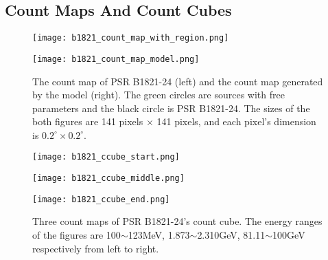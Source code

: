 \documentclass[12pt]{report}
\newcommand{\mycaption}[1]{\protect \caption{#1}}
\begin{document}
    \subsection{Count Maps And Count Cubes}
      \begin{figure}[!ht]
        \begin{center}
        \begin{minipage}{0.45\textwidth}
          \centering 
          \texttt{[image: b1821\_count\_map\_with\_region.png]}
        \end{minipage}
        \begin{minipage}{0.45\textwidth}
          \centering
          \texttt{[image: b1821\_count\_map\_model.png]}
        \end{minipage}
      \end{center}
      \mycaption{The count map of PSR B1821-24 (left) and the count map generated by 
        the model (right). The green circles are sources with free parameters and the black circle
        is PSR B1821-24. The sizes of the both figures are 141 pixels $\times$ 141 pixels, and 
        each pixel's dimension is $0.2^\circ \times 0.2^\circ$.}
      \label{fig: b1821_count_map_with_region_and_model}
      \end{figure}
  
      \begin{figure}[!ht]
        \begin{center}
          \begin{minipage}{0.31\textwidth}
            \begin{center} 
              \texttt{[image: b1821\_ccube\_start.png]}
            \end{center}
          \end{minipage}
          \begin{minipage}{0.31\textwidth}
            \begin{center}
              \texttt{[image: b1821\_ccube\_middle.png]}
            \end{center}
          \end{minipage}
          \begin{minipage}{0.31\textwidth}
            \begin{center}
            \texttt{[image: b1821\_ccube\_end.png]}
            \end{center}
          \end{minipage}
          \end{center}
          \mycaption{Three count maps of PSR B1821-24's count cube. The energy ranges of the 
            figures are 100$\sim$123MeV, 1.873$\sim$2.310GeV, 81.11$\sim$100GeV respectively from 
            left to right.}
          \label{fig: b1821_ccube_1_15_33.png}
      \end{figure}
\end{document}
